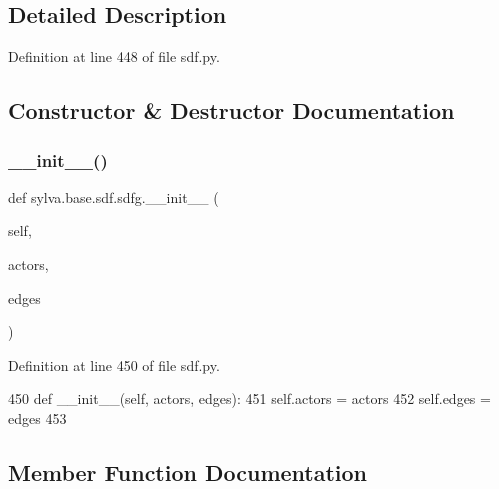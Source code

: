 \subsection{Detailed Description}


Definition at line 448 of file sdf.\+py.



\subsection{Constructor \& Destructor Documentation}
\mbox{\label{classsylva_1_1base_1_1sdf_1_1sdfg_ada06f4f9209867a6aed563cb4c8a62e4}} 
\subsubsection{\texorpdfstring{\+\_\+\+\_\+init\+\_\+\+\_\+()}{\_\_init\_\_()}}
{\footnotesize\ttfamily def sylva.\+base.\+sdf.\+sdfg.\+\_\+\+\_\+init\+\_\+\+\_\+ (\begin{DoxyParamCaption}\item[{}]{self,  }\item[{}]{actors,  }\item[{}]{edges }\end{DoxyParamCaption})}



Definition at line 450 of file sdf.\+py.


\begin{DoxyCode}
450         \textcolor{keyword}{def }\_\_init\_\_(self, actors, edges):
451             self.actors = actors
452             self.edges = edges
453 
\end{DoxyCode}


\subsection{Member Function Documentation}
\mbox{\label{classsylva_1_1base_1_1sdf_1_1sdfg_a56860c252c6363ef47c67a15d979f59f}} 

